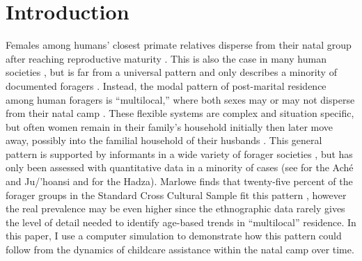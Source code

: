 \documentclass[smallextended]{svjour3}       %
\begin{document}
\section{Introduction}
\label{intro}
Females among humans' closest primate relatives disperse from their natal group after reaching reproductive maturity \cite{nishida1987chimpanzees, gerloff1999intracommunity, stokes2003female}.  This is also the case in many human societies \cite{murdock1967ethnographic}, but is far from a universal pattern and only describes a minority of documented foragers \cite{alvarez2004residence, marlowe2004marital}.  Instead, the modal pattern of post-marital residence among human foragers is “multilocal,” where both sexes may or may not disperse from their natal camp \cite{hill2011co}.  These flexible systems are complex and situation specific, but often women remain in their family's household initially then later move away, possibly into the familial household of their husbands \cite{marlowe2004marital}.  This general pattern is supported by informants in a wide variety of forager societies \cite{lee1974male, hewlett1993intimate, marlowe2004marital, hill1996ache}, but has only been assessed with quantitative data in a minority of cases (see \cite{hill2011co_sup} for the Ach\'{e} and Ju/’hoansi and \cite{jones2005hadza} for the Hadza).  Marlowe finds that twenty-five percent of the forager groups in the Standard Cross Cultural Sample fit this pattern \cite{marlowe2004marital, murdock1969standard}, however the real prevalence may be even higher since the ethnographic data rarely gives the level of detail needed to identify age-based trends in “multilocal” residence.  In this paper, I use a computer simulation to demonstrate how this pattern could follow from the dynamics of childcare assistance within the natal camp over time. 
\end{document}
